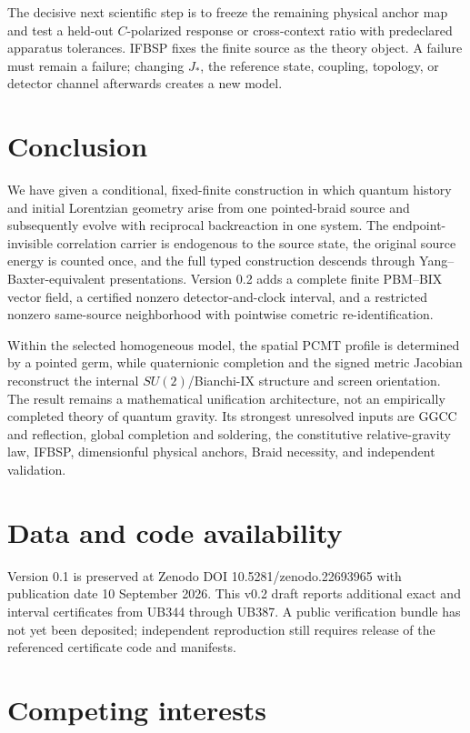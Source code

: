 \documentclass[11pt]{article}
\theoremstyle{definition}
\theoremstyle{remark}
\begin{document}
The decisive next scientific step is to freeze the remaining physical anchor map and test a held-out $C$-polarized response or cross-context ratio with predeclared apparatus tolerances. IFBSP fixes the finite source as the theory object. A failure must remain a failure; changing $J_*$, the reference state, coupling, topology, or detector channel afterwards creates a new model.

\section{Conclusion}

We have given a conditional, fixed-finite construction in which quantum history and initial Lorentzian geometry arise from one pointed-braid source and subsequently evolve with reciprocal backreaction in one system. The endpoint-invisible correlation carrier is endogenous to the source state, the original source energy is counted once, and the full typed construction descends through Yang--Baxter-equivalent presentations. Version 0.2 adds a complete finite PBM--BIX vector field, a certified nonzero detector-and-clock interval, and a restricted nonzero same-source neighborhood with pointwise cometric re-identification.

Within the selected homogeneous model, the spatial PCMT profile is determined by a pointed germ, while quaternionic completion and the signed metric Jacobian reconstruct the internal $SU(2)$/Bianchi-IX structure and screen orientation. The result remains a mathematical unification architecture, not an empirically completed theory of quantum gravity. Its strongest unresolved inputs are GGCC and reflection, global completion and soldering, the constitutive relative-gravity law, IFBSP, dimensionful physical anchors, Braid necessity, and independent validation.

\section*{Data and code availability}

Version 0.1 is preserved at Zenodo DOI 10.5281/zenodo.22693965 with publication date 10 September 2026. This v0.2 draft reports additional exact and interval certificates from UB344 through UB387. A public verification bundle has not yet been deposited; independent reproduction still requires release of the referenced certificate code and manifests.

\section*{Competing interests}
\end{document}
